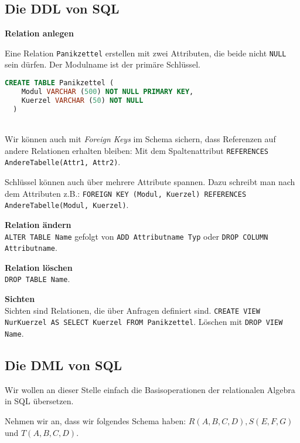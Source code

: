 \documentclass[a4paper,parskip=half*,DIV=15,fontsize=11pt]{scrartcl}
\begin{document}
\subsection{Die DDL von SQL}

\textbf{Relation anlegen}

\begin{minipage}[c]{0.3\textwidth}
Eine Relation \lstinline{Panikzettel} erstellen mit zwei Attributen, die beide nicht \lstinline{NULL} sein dürfen. Der Modulname ist der primäre Schlüssel.
\end{minipage}\hspace{0.05\textwidth}
\begin{minipage}[c]{0.65\textwidth}
\begin{lstlisting}[language=SQL]
CREATE TABLE Panikzettel (
    Modul VARCHAR (500) NOT NULL PRIMARY KEY,
    Kuerzel VARCHAR (50) NOT NULL
  )
\end{lstlisting}
\end{minipage}~\\

Wir können auch mit \emph{Foreign Keys} im Schema sichern, dass Referenzen auf andere Relationen erhalten bleiben: Mit dem Spaltenattribut \lstinline{REFERENCES AndereTabelle(Attr1, Attr2)}.

Schlüssel können auch über mehrere Attribute spannen. Dazu schreibt man nach dem Attributen z.B.: \lstinline{FOREIGN KEY (Modul, Kuerzel) REFERENCES AndereTabelle(Modul, Kuerzel)}.

\textbf{Relation ändern}\\ \lstinline{ALTER TABLE Name} gefolgt von \lstinline{ADD Attributname Typ} oder \lstinline{DROP COLUMN Attributname}.

\textbf{Relation löschen}\\ \lstinline{DROP TABLE Name}.

\textbf{Sichten}\\ Sichten sind Relationen, die über Anfragen definiert sind. \lstinline{CREATE VIEW NurKuerzel AS SELECT Kuerzel FROM Panikzettel}. Löschen mit \lstinline{DROP VIEW Name}.

\subsection{Die DML von SQL}

Wir wollen an dieser Stelle einfach die Basisoperationen der relationalen Algebra in SQL übersetzen.

Nehmen wir an, dass wir folgendes Schema haben: $R(A, B, C, D), S(E, F, G)$ und $T(A, B, C, D)$.
\end{document}
